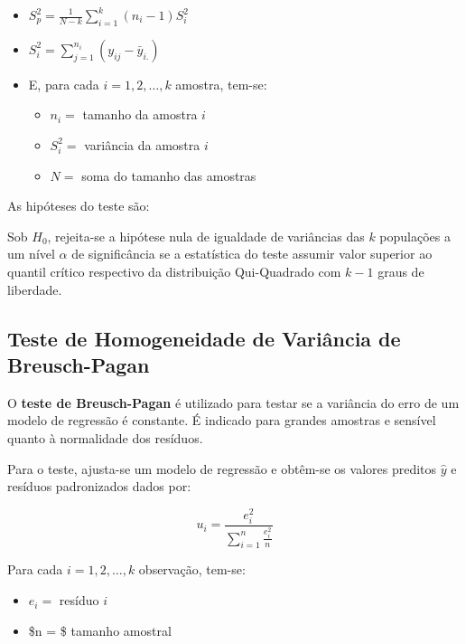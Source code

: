 \documentclass[
]{estat/estat}
\providecommand{\tightlist}{%
  \setlength{\itemsep}{0pt}\setlength{\parskip}{0pt}}\usepackage{longtable,booktabs,array}
\begin{document}
\begin{itemize}
\item
  \(\displaystyle S^2_p = \frac{1}{N - k}\sum_{i=1}^{k}(n_i - 1)S^2_i\)
\item
  \(\displaystyle S^2_i = \sum_{j=1}^{n_i}(y_{ij} - \bar{y}_{i.})\)
\item
  E, para cada \(i=1, 2, \ldots, k\) amostra, tem-se:

  \begin{itemize}
  \tightlist
  \item
    \(n_i =\) tamanho da amostra \(i\)
  \item
    \(S^2_i =\) variância da amostra \(i\)
  \item
    \(N =\) soma do tamanho das amostras
  \end{itemize}
\end{itemize}

As hipóteses do teste são:


Sob \(H_0\), rejeita-se a hipótese nula de igualdade de variâncias das
\(k\) populações a um nível \(\alpha\) de significância se a estatística
do teste assumir valor superior ao quantil crítico respectivo da
distribuição Qui-Quadrado com \(k-1\) graus de liberdade.

\subsection{Teste de Homogeneidade de Variância de
Breusch-Pagan}\label{teste-de-homogeneidade-de-variuxe2ncia-de-breusch-pagan}

O \textbf{teste de Breusch-Pagan} é utilizado para testar se a variância
do erro de um modelo de regressão é constante. É indicado para grandes
amostras e sensível quanto à normalidade dos resíduos.

Para o teste, ajusta-se um modelo de regressão e obtêm-se os valores
preditos \(\hat{y}\) e resíduos padronizados dados por:

\[ u_i = \frac{e_i^2}{\displaystyle \sum_{i=1}^n \frac{e_i^2}{n}} \]

Para cada \(i=1, 2, \ldots, k\) observação, tem-se:

\begin{itemize}
\tightlist
\item
  \(e_i =\) resíduo \(i\)
\item
  \$n = \$ tamanho amostral
\end{itemize}
\end{document}
